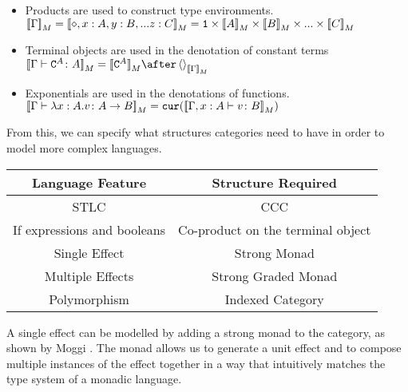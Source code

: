 \documentclass{Report}
\begin{document}

\begin{itemize}
    \item Products are used to construct type environments. $\deno{\G} = \deno{\nil, x: A, y:B, ... z:C} = \1 \times \deno{A} \times \deno{B} \times ... \times \deno{C}$
    \item Terminal objects are used in the denotation of constant terms $\deno{\gtyperelation{\const{A}}{A}} = \deno{\const{A}}\after\term{\deno{\G}}$
    \item Exponentials are used in the denotations of functions. ${\bf [\![}\Gamma \vdash \lambda x : A. v \colon A\rightarrow B{\bf ]\!]}_M = \texttt{cur}({\bf [\![}\Gamma, x: A \vdash v \colon B{\bf ]\!]}_M)$
\end{itemize}

From this, we can specify what structures categories need to have in order to model more complex languages.
\begin{center}
    \begin{tabular}{|c|c|}
        \hline
        Language Feature & Structure Required \\
        \hline
        \hline
        STLC            & CCC \\
        \hline
        If expressions and booleans   & Co-product on the terminal object \\
        \hline
        Single Effect   & Strong Monad \\
        \hline
        Multiple Effects & Strong Graded Monad \\
        \hline
        Polymorphism & Indexed Category \\
        \hline
    \end{tabular}
\end{center}


A single effect can be modelled by adding a strong monad to the category, as shown by Moggi . The monad allows us to generate a unit effect and to compose multiple instances of the effect together in a way that intuitively matches the type system of a monadic language. 
\end{document}
